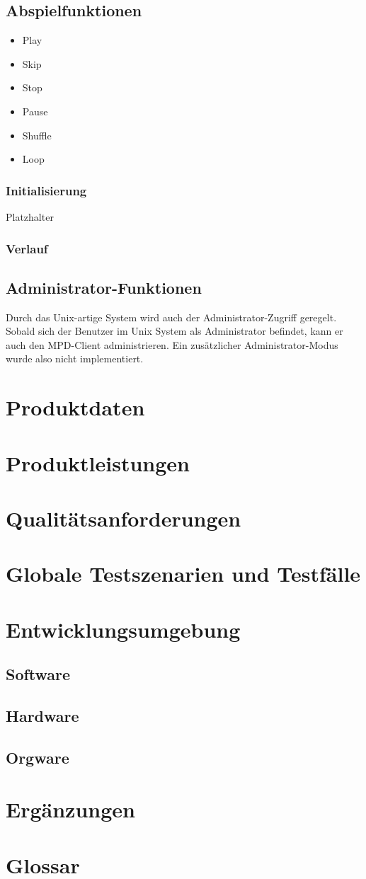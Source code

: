 \subsection{Abspielfunktionen}
\begin{itemize}
	\item Play
	\item Skip
	\item Stop
	\item Pause
	\item Shuffle
	\item Loop
\end{itemize}
\subsubsection{Initialisierung}
Platzhalter
\subsubsection{Verlauf}
\subsection{Administrator-Funktionen}
Durch das Unix-artige System wird auch der Administrator-Zugriff geregelt. Sobald sich der Benutzer im Unix System
als Administrator befindet, kann er auch den MPD-Client administrieren. Ein zusätzlicher Administrator-Modus wurde also
nicht implementiert.
\section{Produktdaten}
\section{Produktleistungen}
\section{Qualitätsanforderungen}
\section{Globale Testszenarien und Testfälle}
\section{Entwicklungsumgebung}
\subsection{Software}
\subsection{Hardware}
\subsection{Orgware}
\section{Ergänzungen}
\section{Glossar}
